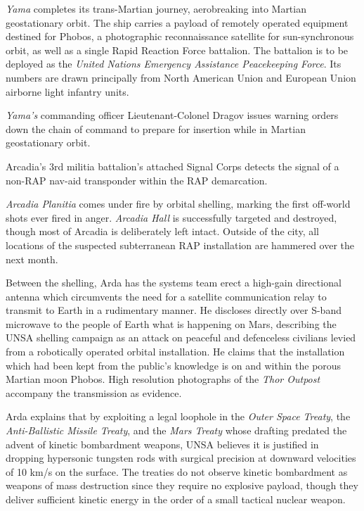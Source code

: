 {\it Yama} completes its trans-Martian journey, aerobreaking into Martian geostationary orbit. The ship carries a payload of remotely operated equipment destined for Phobos, a photographic reconnaissance satellite for sun-synchronous orbit, as well as a single Rapid Reaction Force battalion. The battalion is to be deployed as the {\it United Nations Emergency Assistance Peacekeeping Force}. Its numbers are drawn principally from North American Union and European Union airborne light infantry units.
\StopTimelineDate

{\it Yama's} commanding officer Lieutenant-Colonel Dragov issues warning orders down the chain of command to prepare for insertion while in Martian geostationary orbit.
\StopTimelineDate

Arcadia's 3rd militia battalion's attached Signal Corps detects the signal of a non-RAP nav-aid transponder within the RAP demarcation.
\StopTimelineDate

{\it Arcadia Planitia} comes under fire by orbital shelling, marking the first off-world shots ever fired in anger. {\it Arcadia Hall} is successfully targeted and destroyed, though most of Arcadia is deliberately left intact. Outside of the city, all locations of the suspected subterranean RAP installation are hammered over the next month.

Between the shelling, Arda has the systems team erect a high-gain directional antenna which circumvents the need for a satellite communication relay to transmit to Earth in a rudimentary manner. He discloses directly over S-band microwave to the people of Earth what is happening on Mars, describing the UNSA shelling campaign as an attack on peaceful and defenceless civilians levied from a robotically operated orbital installation. He claims that the installation which had been kept from the public's knowledge is on and within the porous Martian moon Phobos. High resolution photographs of the {\it Thor Outpost} accompany the transmission as evidence.

Arda explains that by exploiting a legal loophole in the {\it Outer Space Treaty}, the {\it Anti-Ballistic Missile Treaty}, and the {\it Mars Treaty} whose drafting predated the advent of kinetic bombardment weapons, UNSA believes it is justified in dropping hypersonic tungsten rods with surgical precision at downward velocities of 10 km/s on the surface. The treaties do not observe kinetic bombardment as weapons of mass destruction since they require no explosive payload, though they deliver sufficient kinetic energy in the order of a small tactical nuclear weapon.


